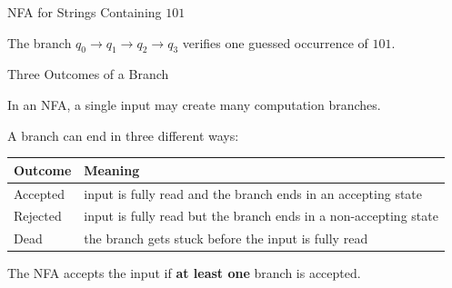 \documentclass[10pt,aspectratio=169]{beamer}
\begin{document}
\begin{frame}{NFA for Strings Containing \(101\)}

\begin{center}
\end{center}

\vspace{0.5em}

The branch \(q_0\to q_1\to q_2\to q_3\) verifies one guessed occurrence of \(101\).

\end{frame}
\begin{frame}{Three Outcomes of a Branch}

In an NFA, a single input may create many computation branches.

\vspace{0.7em}

A branch can end in three different ways:

\begin{center}
\begin{tabular}{ll}
\toprule
\textbf{Outcome} & \textbf{Meaning}\\
\midrule
\textcolor{green!50!black}{Accepted} & input is fully read and the branch ends in an accepting state\\
\textcolor{red!70!black}{Rejected} & input is fully read but the branch ends in a non-accepting state\\
\textcolor{gray!70!black}{Dead} & the branch gets stuck before the input is fully read\\
\bottomrule
\end{tabular}
\end{center}

\vspace{0.7em}

\pause
The NFA accepts the input if \textbf{at least one} branch is accepted.

\end{frame}
\end{document}
